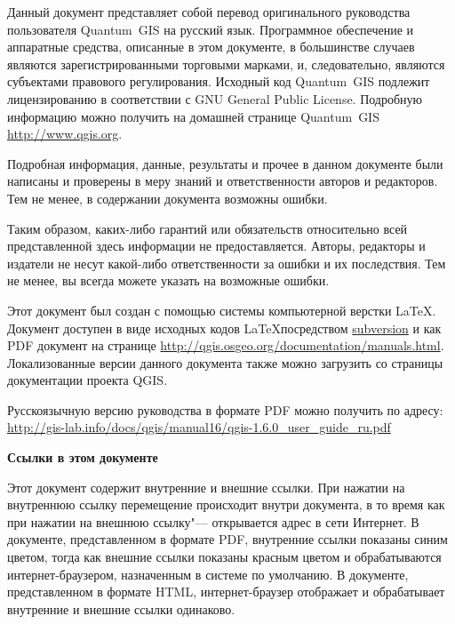 \frontmatter
\pagestyle{scrplain}
\vspace{1cm}


Данный документ представляет собой перевод оригинального руководства
пользователя Quantum~GIS на русский язык. Программное обеспечение и
аппаратные средства, описанные в этом документе, в большинстве случаев
являются зарегистрированными торговыми марками, и, следовательно, являются
субъектами правового регулирования. Исходный код Quantum~GIS подлежит
лицензированию в соответствии с GNU General Public License. Подробную
информацию можно получить на домашней странице Quantum~GIS
\url{http://www.qgis.org}.
\par\bigskip
Подробная информация, данные, результаты и прочее в данном документе
были написаны и проверены в меру знаний и ответственности авторов и
редакторов. Тем не менее, в содержании документа возможны ошибки.
\par\bigskip
Таким образом, каких-либо гарантий или обязательств
относительно всей представленной здесь информации не предоставляется.
Авторы, редакторы и издатели не несут какой-либо ответственности за ошибки
и их последствия. Тем не менее, вы всегда можете указать на возможные ошибки.
\par\bigskip
Этот документ был создан с помощью системы компьютерной верстки \LaTeX.
Документ доступен в виде исходных кодов \LaTeX посредством
\href{http://wiki.qgis.org/qgiswiki/DocumentationWritersCorner}{subversion}
и как PDF документ на странице
\url{http://qgis.osgeo.org/documentation/manuals.html}.
Локализованные версии данного документа также можно загрузить со
страницы документации проекта QGIS.

Русскоязычную версию руководства в формате PDF можно получить по адресу:\\
\url{http://gis-lab.info/docs/qgis/manual16/qgis-1.6.0_user_guide_ru.pdf}

\vspace{1cm}
\noindent
\textbf{Ссылки в этом документе}
\par\bigskip
Этот документ содержит внутренние и внешние ссылки. При нажатии на
внутреннюю ссылку перемещение происходит внутри документа, в то время
как при нажатии на внешнюю ссылку"--- открывается адрес в сети Интернет.
В документе, представленном в формате PDF, внутренние ссылки показаны
синим цветом, тогда как внешние ссылки показаны красным цветом и
обрабатываются интернет-браузером, назначенным в системе по умолчанию. В
документе, представленном в формате HTML, интернет-браузер отображает и
обрабатывает внутренние и внешние ссылки одинаково.

